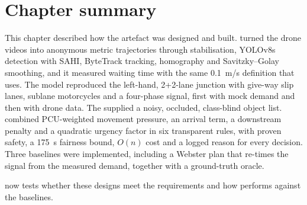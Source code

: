 \section{Chapter summary}

This chapter described how the artefact was designed and built. \dtx{} turned the drone videos into
anonymous metric trajectories through stabilisation, YOLOv8s detection with SAHI, ByteTrack tracking,
homography and Savitzky--Golay smoothing, and it measured waiting time with the same 0.1~m/s
definition that \sumo{} uses. The \sumo{} model reproduced the left-hand, 2+2-lane junction with
give-way slip lanes, sublane motorcycles and a four-phase signal, first with mock demand and then with drone data. The \vls{} supplied a noisy, occluded, class-blind
object list. \prism{} combined PCU-weighted movement pressure, an arrival term, a downstream penalty
and a quadratic urgency factor in six transparent rules, with proven safety, a 175~s fairness bound,
$O(n)$ cost and a logged reason for every decision. Three baselines were implemented, including a
Webster plan that re-times the signal from the measured demand, together with a ground-truth oracle.

 now tests whether these designs meet the requirements and how \prism{} performs
against the baselines.
